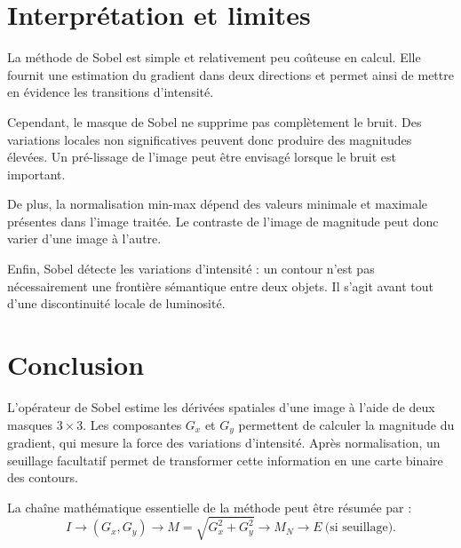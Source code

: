 \documentclass[11pt,a4paper]{article}
\begin{document}
\section{Interprétation et limites}

La méthode de Sobel est simple et relativement peu coûteuse en calcul.
Elle fournit une estimation du gradient dans deux directions et permet
ainsi de mettre en évidence les transitions d'intensité.

Cependant, le masque de Sobel ne supprime pas complètement le bruit.
Des variations locales non significatives peuvent donc produire des
magnitudes élevées. Un pré-lissage de l'image peut être envisagé lorsque
le bruit est important.

De plus, la normalisation min-max dépend des valeurs minimale et maximale
présentes dans l'image traitée. Le contraste de l'image de magnitude peut
donc varier d'une image à l'autre.

Enfin, Sobel détecte les variations d'intensité : un contour n'est pas
nécessairement une frontière sémantique entre deux objets. Il s'agit avant
tout d'une discontinuité locale de luminosité.

\section{Conclusion}

L'opérateur de Sobel estime les dérivées spatiales d'une image à l'aide de
deux masques $3\times3$. Les composantes $G_x$ et $G_y$ permettent de
calculer la magnitude du gradient, qui mesure la force des variations
d'intensité. Après normalisation, un seuillage facultatif permet de
transformer cette information en une carte binaire des contours.

La chaîne mathématique essentielle de la méthode peut être résumée par :
\[
    I
    \longrightarrow
    (G_x,G_y)
    \longrightarrow
    M=\sqrt{G_x^2+G_y^2}
    \longrightarrow
    M_N
    \longrightarrow
    E\ \text{(si seuillage)}.
\]
\end{document}
